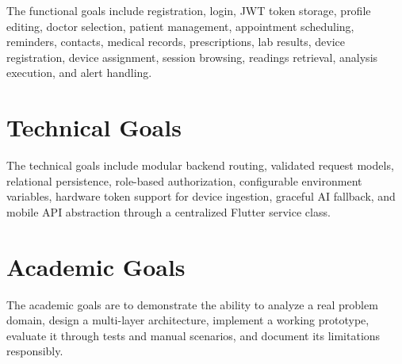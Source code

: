 The functional goals include registration, login, JWT token storage, profile editing, doctor selection, patient management, appointment scheduling, reminders, contacts, medical records, prescriptions, lab results, device registration, device assignment, session browsing, readings retrieval, analysis execution, and alert handling.

\section{Technical Goals}

The technical goals include modular backend routing, validated request models, relational persistence, role-based authorization, configurable environment variables, hardware token support for device ingestion, graceful AI fallback, and mobile API abstraction through a centralized Flutter service class.

\section{Academic Goals}

The academic goals are to demonstrate the ability to analyze a real problem domain, design a multi-layer architecture, implement a working prototype, evaluate it through tests and manual scenarios, and document its limitations responsibly.
